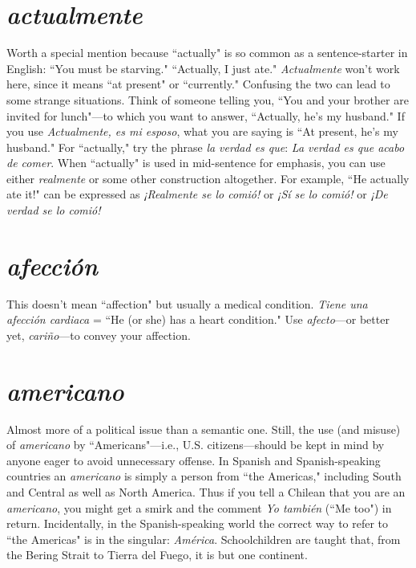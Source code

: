 \section{\emph{actualmente}}

Worth a special mention because ``actually"
is so common as a sentence-starter in English: ``You must be starving."
``Actually, I just ate." \emph{Actualmente} won't work here, since it means
``at present" or ``currently." Confusing the two can lead to some
strange situations. Think of someone telling you, ``You and your
brother are invited for lunch"---to which you want to answer, ``Actually, he's my husband." If you use \emph{Actualmente, es mi esposo}, what
you are saying is ``At present, he's my husband." For ``actually," try the
phrase \emph{la verdad es que}: \emph{La verdad es que acabo de comer}. When ``actually" is used in mid-sentence for emphasis, you can use either
\emph{realmente} or some other construction altogether. For example, ``He actually ate it!" can be expressed as \emph{¡Realmente se lo comió!} or \emph{¡Sí se lo
	comió!} or \emph{¡De verdad se lo comió!}

\section{\emph{afección}}

This doesn't mean ``affection" but usually a
medical condition. \emph{Tiene una afección cardiaca} = ``He (or she) has a
heart condition." Use \emph{afecto}---or better yet, \emph{cariño}---to convey your
affection.

\section{\emph{americano}}

Almost more of a political issue than a semantic one. Still, the use (and misuse) of \emph{americano} by ``Americans"---i.e.,
U.S. citizens---should be kept in mind by anyone eager to avoid unnecessary offense. In Spanish and Spanish-speaking countries an \emph{americano} is simply a person from ``the Americas," including South and
Central as well as North America. Thus if you tell a Chilean that you
are an \emph{americano}, you might get a smirk and the comment \emph{Yo también} (``Me too") in return. Incidentally, in the Spanish-speaking world
the correct way to refer to ``the Americas" is in the singular: \emph{América}.
Schoolchildren are taught that, from the Bering Strait to Tierra del
Fuego, it is but one continent.

